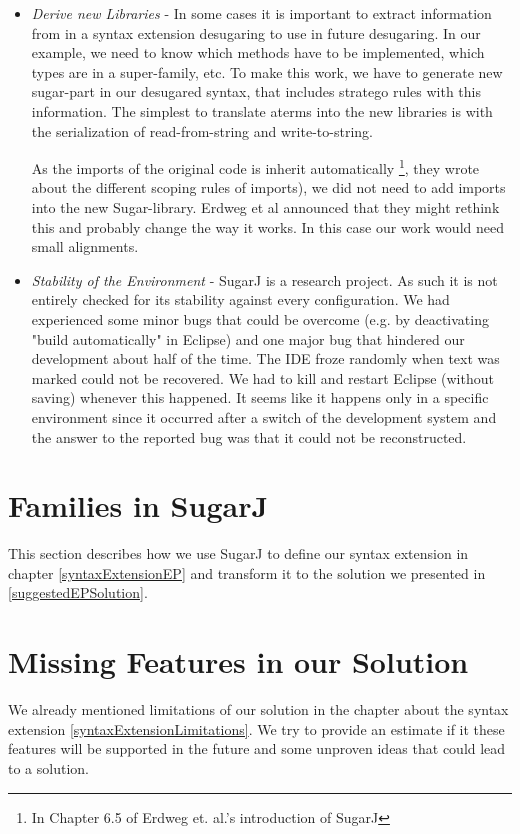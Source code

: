 \documentclass{report}
\begin{document}
\begin{itemize}
\begin{enumerate}
\end{enumerate}
\item \emph{Derive new Libraries} - In some cases it is important to extract information from in a syntax extension desugaring to use in future desugaring. In our example, we need to know which methods have to be implemented, which types are in a super-family, etc. To make this work, we have to generate new sugar-part in our desugared syntax, that includes stratego rules with this information. The simplest to translate aterms into the new libraries is with the serialization of read-from-string and write-to-string.

As the imports of the original code is inherit automatically \footnote{In Chapter 6.5 of Erdweg et. al.'s introduction of SugarJ\cite{Erdweg-SugarJ-2011}}, they wrote about the different scoping rules of imports), we did not need to add imports into the new Sugar-library. Erdweg et al announced that they might rethink this and probably change the way it works. In this case our work would need small alignments.
\item \emph{Stability of the Environment} - SugarJ is a research project. As such it is not entirely checked for its stability against every configuration. We had experienced some minor bugs that could be overcome (e.g. by deactivating "build automatically" in Eclipse) and one major bug that hindered our development about half of the time. The IDE froze randomly when text was marked could not be recovered. We had to kill and restart  Eclipse (without saving) whenever this happened. It seems like it happens only in a specific environment since it occurred after a switch of the development system and the answer to the reported bug was that it could not be reconstructed.
\end{itemize}

\section{Families in SugarJ}

This section describes how we use SugarJ to define our syntax extension in chapter \ref{syntaxExtensionEP} and transform it to the solution we presented in \ref{suggestedEPSolution}.


\section{Missing Features in our Solution}
We already mentioned limitations of our solution in the chapter about the syntax extension \ref{syntaxExtensionLimitations}. We try to provide an estimate if it these features will be supported in the future and some unproven ideas that could lead to a solution.
\end{document}
